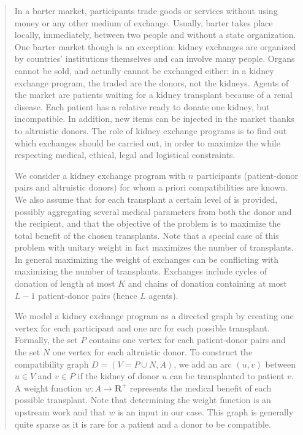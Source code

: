 \documentclass[a4paper,twocolumn]{article}
\newcommand{\R}{\mathbf{R}}
\begin{document}
\begin{quotation}
  In a barter market, participants trade goods or services without using money or any other medium of exchange. Usually, barter takes place locally, immediately, between two people and without a state organization. One barter market though is an exception: kidney exchanges are organized by countries’ institutions themselves and can involve many people. Organs cannot be sold, and actually cannot be exchanged either: in a kidney exchange program, the traded  are the donors, not the kidneys. Agents of the market are patients waiting for a kidney transplant because of a renal disease. Each patient has a relative ready to donate one kidney, but incompatible. In addition, new items can be injected in the market thanks to altruistic donors. The role of kidney exchange programs is to find out which exchanges should be carried out, in order to maximize the  while respecting medical, ethical, legal and logistical constraints.

  We consider a kidney exchange program with $n$ participants (patient-donor pairs and altruistic donors) for whom a priori compatibilities are known. We also assume that for each transplant a certain level of  is provided, possibly aggregating several medical parameters from both the donor and the recipient, and that the objective of the problem is to maximize the total benefit of the chosen transplants. Note that a special case of this problem with unitary weight in fact maximizes the number of transplants. In general maximizing the weight of exchanges can be conflicting with maximizing the number of transplants. Exchanges include cycles of donation of length at most $K$ and chains of donation containing at most $L - 1$ patient-donor pairs (hence $L$ agents).

  We model a kidney exchange program as a directed graph by creating one vertex for each participant and one arc for each possible transplant. Formally, the set $P$ contains one vertex for each patient-donor pairs and the set $N$ one vertex for each altruistic donor. To construct the compatibility graph $D = (V = P \cup N, A)$, we add an arc $(u, v)$ between $u \in V$ and $v \in P$ if the kidney of donor $u$ can be transplanted to patient $v$. A weight function $w: A \to \R^+$ represents the medical benefit of each possible transplant. Note that determining the weight function is an upstream work and that $w$ is an input in our case. This graph is generally quite sparse as it is rare for a patient and a donor to be compatible.
\end{quotation}
\end{document}
